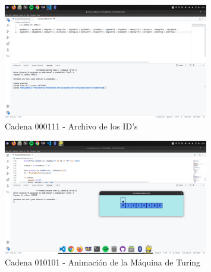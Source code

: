 \documentclass[11pt]{article} %
\begin{document}
	\newpage

	
	\begin{figure}[h]
		\centering
		\includegraphics[width=0.8\textwidth]{arch1}
		\caption{Cadena 000111 - Archivo de los ID's}
	\end{figure}
	\begin{figure}[h]
		\centering
		\includegraphics[width=0.8\textwidth]{manual5}
		\caption{Cadena 010101 - Animación de la Máquina de Turing}
	\end{figure}
	
\end{document}
